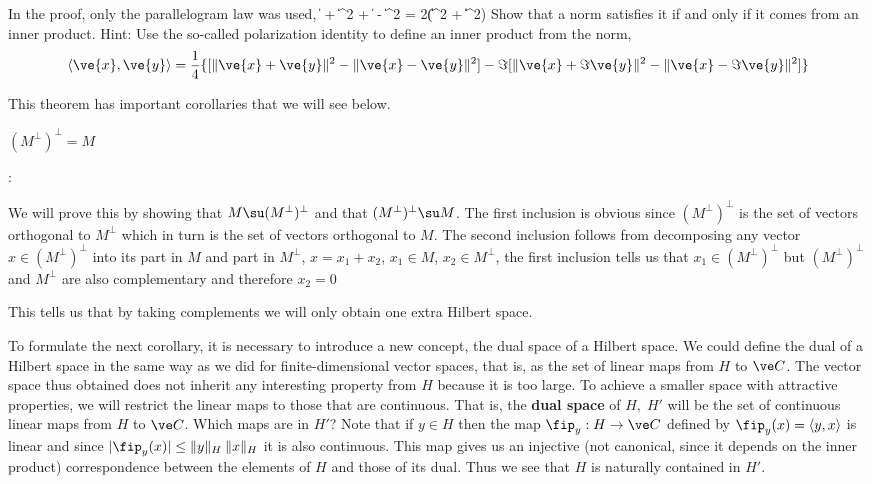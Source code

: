 \bpro 
In the proof, only the parallelogram law was used,
\beq
\label{paralelogramo}
\| + \|^2 + \| - \|^2  = 
                     2(\|\|^2 + \|\|^2) 
\eeq
%
Show that a norm satisfies it if and only if it comes from an
inner product. 
Hint: Use the so-called polarization identity to define an 
inner product from the norm,
\begin{equation}
  \label{eq:polarizacion}
  \langle\ve{x}, \ve{y}\rangle = \frac{1}{4}\{
               [\|\ve{x} + \ve{y}\|^2 - \|\ve{x} - \ve{y}\|^2]
              -\Im [\|\ve{x} + \Im \ve{y}\|^2 - \|\ve{x} - \Im \ve{y}\|^2]\}
\end{equation}
\epro

This theorem has important corollaries that we will see below.

\bcor 
$(M^{\perp})^{\perp}=M$
\ecor

\pru:

We will prove this by showing that $M\su (M^{\perp})^{\perp}$ and that 
$(M^{\perp})^{\perp}\su M$.
The first inclusion is obvious since $(M^{\perp})^{\perp}$ 
is the set of vectors orthogonal
to $M^{\perp}$ which in turn is the set of vectors orthogonal to $M$.
The second inclusion follows from decomposing any vector
$x\in (M^{\perp})^{\perp}$ into its part in $M$ and part in $M^{\perp}$, $
x=x_1+x_2$, $x_1\in M$, $x_2\in M^{\perp}$,  
the first inclusion tells us that $x_1\in(M^{\perp})^{\perp}$ but
$(M^{\perp})^{\perp}$ and $M^{\perp}$ are also
complementary and therefore $x_2=0$ 
\epru

This tells us that by taking complements we will only obtain
one extra Hilbert space.

To formulate the next corollary, it is necessary to introduce a new
concept, the dual space of a Hilbert space. We could
define the dual of a Hilbert space in the same way as we
did for finite-dimensional vector spaces, that is, as
the set of linear maps from $H$ to $\ve C$. The vector space thus
obtained does not inherit any interesting property from $H$ because it is too large.
To achieve a smaller space with attractive properties,
we will restrict the linear maps to those that are continuous. 
That is,
the {\bf dual space} of $H,\;H'$ will be the set of continuous linear maps 
from $H$ to $\ve C$. 
Which maps are in $H'$? 
Note that if $y\in H$ then the map $\fip_y:H\to \ve C$ 
defined by $\fip_y(x)=\langle y,x\rangle$ is linear and since $|\fip_y(x)|\leq\|y\|_H\:\|x\|_H$
it is also continuous. This map gives us an injective 
(not canonical, since it depends on the inner product) correspondence between the
elements of $H$ and those of its dual.
Thus we see that $H$ is naturally contained in $H'$.

